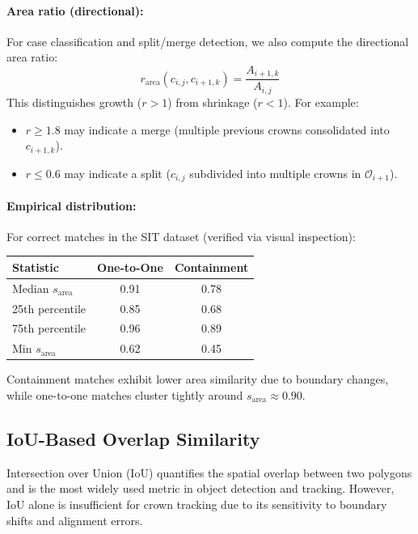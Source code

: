 \paragraph{Area ratio (directional):}
For case classification and split/merge detection, we also compute the directional area ratio:
\[
r_{\text{area}}(c_{i,j}, c_{i+1,k}) = \frac{A_{i+1,k}}{A_{i,j}}
\]
This distinguishes growth ($r > 1$) from shrinkage ($r < 1$). For example:
\begin{itemize}
    \item $r \geq 1.8$ may indicate a merge (multiple previous crowns consolidated into $c_{i+1,k}$).
    \item $r \leq 0.6$ may indicate a split ($c_{i,j}$ subdivided into multiple crowns in $\mathcal{O}_{i+1}$).
\end{itemize}

\paragraph{Empirical distribution:}
For correct matches in the SIT dataset (verified via visual inspection):
\begin{center}
\begin{tabular}{lcc}
\toprule
Statistic & One-to-One & Containment \\
\midrule
Median $s_{\text{area}}$ & 0.91 & 0.78 \\
25th percentile & 0.85 & 0.68 \\
75th percentile & 0.96 & 0.89 \\
Min $s_{\text{area}}$ & 0.62 & 0.45 \\
\bottomrule
\end{tabular}
\end{center}
Containment matches exhibit lower area similarity due to boundary changes, while one-to-one matches cluster tightly around $s_{\text{area}} \approx 0.90$.

\subsection{IoU-Based Overlap Similarity}

Intersection over Union (IoU) quantifies the spatial overlap between two polygons and is the most widely used metric in object detection and tracking. However, IoU alone is insufficient for crown tracking due to its sensitivity to boundary shifts and alignment errors.

